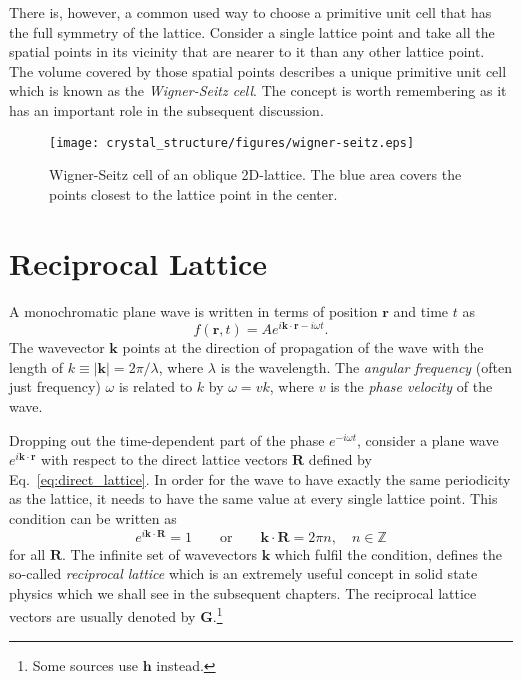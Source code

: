 There is, however, a common used way to choose a primitive unit cell that has the full symmetry of the lattice. Consider a single lattice point and take all the spatial points in its vicinity that are nearer to it than any other lattice point. The volume covered by those spatial points describes a unique primitive unit cell which is known as the \emph{Wigner-Seitz cell}. The concept is worth remembering as it has an important role in the subsequent discussion.

\vspace*{0.5cm}
\begin{figure}[h!]
\centering
\texttt{[image: crystal\_structure/figures/wigner-seitz.eps]}
\caption{Wigner-Seitz cell of an oblique 2D-lattice. The blue area covers the points closest to the lattice point in the center.}
\end{figure}

\section{Reciprocal Lattice}
A monochromatic plane wave is written in terms of position $\mathbf{r}$ and time $t$ as 
\begin{equation}
f(\mathbf{r},t) = A e^{i\mathbf{k}\cdot\mathbf{r} - i\omega t}.
\end{equation}
The wavevector $\mathbf{k}$ points at the direction of propagation of the wave with the length of $k \equiv |\mathbf{k}| = 2\pi/\lambda$, where $\lambda$ is the wavelength. The \emph{angular frequency} (often just frequency) $\omega$ is related to $k$ by $\omega = v k$, where $v$ is the \emph{phase velocity} of the wave.

Dropping out the time-dependent part of the phase $e^{-i\omega t}$, consider a plane wave $e^{i\mathbf{k}\cdot\mathbf{r}}$ with respect to the direct lattice vectors $\mathbf{R}$ defined by Eq.~\eqref{eq:direct_lattice}. In order for the wave to have exactly the same periodicity as the lattice, it needs to have the same value at every single lattice point. This condition can be written as
\begin{equation}
e^{i\mathbf{k}\cdot\mathbf{R}} = 1 \qquad \mathrm{or} \qquad  \mathbf{k}\cdot\mathbf{R} = 2 \pi n, \quad n \in \mathbb{Z}
\end{equation}
for all $\mathbf{R}$. The infinite set of wavevectors $\mathbf{k}$ which fulfil the condition, defines the so-called \emph{reciprocal lattice} which is an extremely useful concept in solid state physics which we shall see in the subsequent chapters. The reciprocal lattice vectors are usually denoted by $\mathbf{G}$.\footnote{Some sources use $\mathbf{h}$ instead.}

